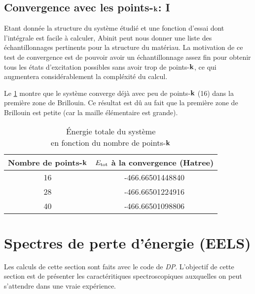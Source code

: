 \subsection{Convergence avec les points-$\vb{k}$: I}
Etant donnée la structure du système étudié et une fonction d'essai dont l'intégrale est facile à calculer,
Abinit peut nous donner une liste des échantillonnages pertinents pour la structure du matériau.
La motivation de ce test de convergence est de pouvoir avoir un échantillonnage
assez fin pour obtenir tous les états d'excitation possibles sans avoir trop de points-$\vb{k}$,
ce qui augmentera considérablement la compléxité du calcul.

Le \cref{tab-etotPK} montre que le système converge déjà avec peu de points-$\vb{k}$ (16) dans la première zone de Brillouin.
Ce résultat est dû au fait que la première zone de Brillouin est petite (car la maille élémentaire est grande).
\begin{table}[ht]
  \captionsetup{width=0.6\textwidth}
  \caption{Énergie totale du système\\ en fonction du nombre de points-$\vb{k}$}\label{tab-etotPK}
  \centering
  \begin{tabular}{c c}
    \toprule
    Nombre de points-$\vb{k}$  &  $E_{\textnormal{tot}}$ à la convergence (Hatree)
    \\
    \midrule
    16    &  -466.66501448840
    \\
    28    &  -466.66501224916
    \\
    40    &  -466.66501098806
    \\
    \bottomrule
  \end{tabular}
\end{table}
\section{Spectres de perte d'énergie (EELS)}
Les calculs de cette section sont faits avec le code de \textit{DP}.
L'objectif de cette section est de présenter les caractéritiques spectroscopiques
auxquelles on peut s'attendre dans une vraie expérience.

